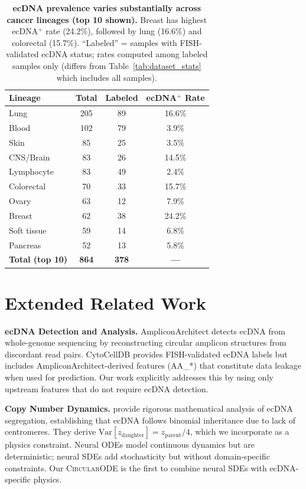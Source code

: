 \documentclass{article}
\newcommand{\circularode}{\textsc{CircularODE}}
\begin{document}
\begin{table}[h]
\caption{\textbf{ecDNA prevalence varies substantially across cancer lineages (top 10 shown).} Breast has highest ecDNA$^+$ rate (24.2\%), followed by lung (16.6\%) and colorectal (15.7\%). ``Labeled'' = samples with FISH-validated ecDNA status; rates computed among labeled samples only (differs from Table~\ref{tab:dataset_stats} which includes all samples).}
\label{tab:lineage_prevalence}
\centering
\small
\begin{tabular}{@{}lccc@{}}
\toprule
Lineage & Total & Labeled & ecDNA$^+$ Rate \\
\midrule
Lung & 205 & 89 & 16.6\% \\
Blood & 102 & 79 & 3.9\% \\
Skin & 85 & 25 & 3.5\% \\
CNS/Brain & 83 & 26 & 14.5\% \\
Lymphocyte & 83 & 49 & 2.4\% \\
Colorectal & 70 & 33 & 15.7\% \\
Ovary & 63 & 12 & 7.9\% \\
Breast & 62 & 38 & 24.2\% \\
Soft tissue & 59 & 14 & 6.8\% \\
Pancreas & 52 & 13 & 5.8\% \\
\midrule
\textbf{Total (top 10)} & \textbf{864} & \textbf{378} & \textbf{---} \\
\bottomrule
\end{tabular}
\end{table}

\section{Extended Related Work}
\label{app:related}

\textbf{ecDNA Detection and Analysis.} AmpliconArchitect \citep{deshpande_2019_amplicon} detects ecDNA from whole-genome sequencing by reconstructing circular amplicon structures from discordant read pairs. CytoCellDB \citep{cytocelldb_2024} provides FISH-validated ecDNA labels but includes AmpliconArchitect-derived features (AA\_*) that constitute data leakage when used for prediction. Our work explicitly addresses this by using only upstream features that do not require ecDNA detection.

\textbf{Copy Number Dynamics.} \citet{lange_2022_mathematical} provide rigorous mathematical analysis of ecDNA segregation, establishing that ecDNA follows binomial inheritance due to lack of centromeres. They derive $\text{Var}[z_{\text{daughter}}] = z_{\text{parent}}/4$, which we incorporate as a physics constraint. Neural ODEs \citep{chen_2018_neuralode} model continuous dynamics but are deterministic; neural SDEs \citep{li_2020_neuralsde} add stochasticity but without domain-specific constraints. Our \circularode{} is the first to combine neural SDEs with ecDNA-specific physics.
\end{document}
